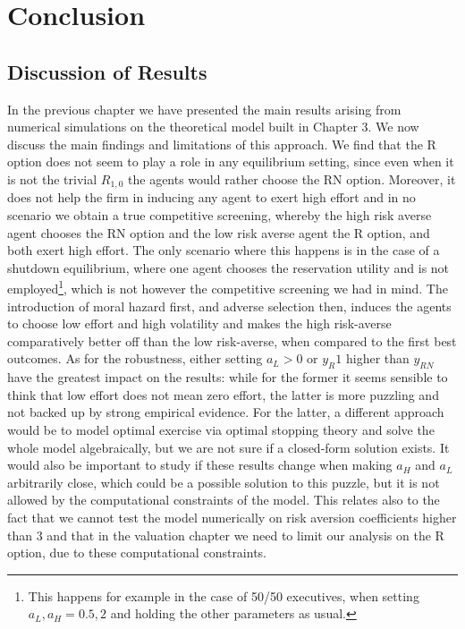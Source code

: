 \section{Conclusion}

\subsection{Discussion of Results}
In the previous chapter we have presented the main results arising from numerical simulations on the theoretical model built in Chapter 3. We now discuss the main findings and limitations of this approach. 
We find that the R option does not seem to play a role in any equilibrium setting, since even when it is not the trivial $R_{1,0}$ the agents would rather choose the RN option. Moreover, it does not help the firm in inducing any agent to exert high effort and in no scenario we obtain a true competitive screening, whereby the high risk averse agent chooses the RN option and the low risk averse agent the R option, and both exert high effort. The only scenario where this happens is in the case of a shutdown equilibrium, where one agent chooses the reservation utility and is not employed\footnote{This happens for example in the case of 50/50 executives, when setting $a_L, a_H = 0.5,2$ and holding the other parameters as usual.}, which is not however the competitive screening we had in mind.
The introduction of moral hazard first, and adverse selection then, induces the agents to choose low effort and high volatility and makes the high risk-averse comparatively better off than the low risk-averse, when compared to the first best outcomes. As for the robustness, either setting $a_L > 0$ or $y_R1$ higher than $y_{RN}$ have the greatest impact on the results: while for the former it seems sensible to think that low effort does not mean zero effort, the latter is more puzzling and not backed up by strong empirical evidence. For the latter, a different approach would be to model optimal exercise via optimal stopping theory and solve the whole model algebraically, but we are not sure if a closed-form solution exists. It would also be important to study if these results change when making $a_H$ and $a_L$ arbitrarily close, which could be a possible solution to this puzzle, but it is not allowed by the computational constraints of the model. This relates also to the fact that we cannot test the model numerically on risk aversion coefficients higher than $3$ and that in the valuation chapter we need to limit our analysis on the R option, due to these computational constraints.
